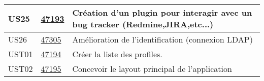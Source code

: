 \begin{center}
\begin{tabular}{|l|p{1.5cm}|p{14cm}|}
        \hline
US25	&	\href{https://redmine-projets.smile.fr/issues/47193}{47193}	&	Création d'un plugin pour interagir avec un bug tracker (Redmine,JIRA,etc...)	                \\
        \hline
US26	&	\href{https://redmine-projets.smile.fr/issues/47305}{47305}	&	Amélioration de l'identification (connexion LDAP)	                                            \\
        \hline
UST01	&	\href{https://redmine-projets.smile.fr/issues/47194}{47194}	&	Créer la liste des profiles.	                                                                \\
        \hline
UST02	&	\href{https://redmine-projets.smile.fr/issues/47195}{47195}	&	Concevoir le layout principal de l'application	                                                \\
        \hline
    \end{tabular}
\end{center}
\newpage{}

	

\newpage{}


\newpage{}


\newpage{}


\newpage{}


\newpage{}


\newpage{}


\newpage{}


\newpage{}


\newpage{}


\newpage{}


\newpage{}


\newpage{}


\newpage{}


\newpage{}


\newpage{}


\newpage{}


\newpage{}

